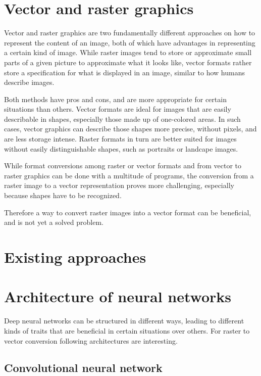 \documentclass[12pt, a4paper, titlepage]{report}
\begin{document}
\section{Vector and raster graphics}

Vector and raster graphics are two fundamentally different approaches on how to represent the content of an image, both of which have advantages in representing a certain kind of image. While raster images tend to store or approximate small parts of a given picture to approximate what it looks like, vector formats rather store a specification for what is displayed in an image, similar to how humans describe images.

Both methods have pros and cons, and are more appropriate for certain situations than others. Vector formats are ideal for images that are easily describable in shapes, especially those made up of one-colored areas. In such cases, vector graphics can describe those shapes more precise, without pixels, and are less storage intense. Raster formats in turn are better suited for images without easily distinguishable shapes, such as portraits or landcape images.

While format conversions among raster or vector formats and from vector to raster graphics can be done with a multitude of programs, the conversion from a raster image to a vector representation proves more challenging, especially because shapes have to be recognized.

Therefore a way to convert raster images into a vector format can be beneficial, and is not yet a solved problem.


\section{Existing approaches}

\section{Architecture of neural networks}

Deep neural networks can be structured in different ways, leading to different kinds of traits that are beneficial in certain situations over others. For raster to vector conversion following architectures are interesting.

\subsection{Convolutional neural network}
\end{document}
